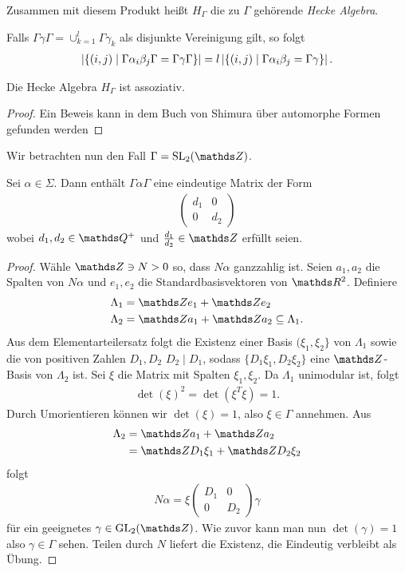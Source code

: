 \begin{defi}
Zusammen mit diesem Produkt heißt $H_\Gamma$ die zu $\Gamma$ gehörende \emph{Hecke Algebra}.
\end{defi}

Falls $\Gamma \gamma \Gamma=\cup_{k=1}^l \Gamma \gamma_k$ als disjunkte Vereinigung gilt,
so folgt
\begin{align*}
\left\vert\{(i,j)\mid \Gamma \alpha_i \beta_j \Gamma=\Gamma \gamma \Gamma\}\right\vert=l \left\vert\{(i,j)\mid \Gamma \alpha_i \beta_j =\Gamma \gamma\}\right\vert.
\end{align*}

\begin{thm}
Die Hecke Algebra $H_\Gamma$ ist assoziativ.
\end{thm}
\begin{proof}
Ein Beweis kann in dem Buch von Shimura über automorphe Formen gefunden werden
\end{proof}

Wir betrachten nun den Fall $\Gamma =\SL_2(\Z)$.
\begin{prop}
Sei $\alpha \in \Sigma$.
Dann enthält $\Gamma \alpha \Gamma$ eine eindeutige Matrix der Form
\begin{align*}
\begin{pmatrix}
d_1&0\\
0&d_2
\end{pmatrix}
\end{align*}
wobei $d_1,d_2 \in \Q^+$ und $\frac{d_1}{d_2}\in \Z$ erfüllt seien.
\end{prop}
\begin{proof}
Wähle $\Z \ni N>0$ so, dass $N\alpha$ ganzzahlig ist.
Seien $a_1,a_2$ die Spalten von $N\alpha$ und $e_1,e_2$ die Standardbasisvektoren von $\R^2$.
Definiere
\begin{align*}
\Lambda_1 &=\Z e_1+\Z e_2\\
\Lambda_2 &=\Z a_1+\Z a_2\subseteq \Lambda_1.
\end{align*}
Aus dem Elementarteilersatz folgt die Existenz einer Basis $(\xi_1,\xi_2\}$ von $\Lambda_1$ sowie die von positiven Zahlen $D_1,D_2$
$D_2 \mid D_1$, sodass $\{D_1\xi_1,D_2\xi_2\}$ eine $\Z$-Basis von $\Lambda_2$ ist.
Sei $\xi$ die Matrix mit Spalten $\xi_1,\xi_2$.
Da $\Lambda_1$ unimodular ist, folgt
\begin{align*}
\det(\xi)^2=\det(\xi^T \xi)=1.
\end{align*}
Durch Umorientieren können wir $\det(\xi)=1$, also $\xi \in \Gamma$ annehmen.
Aus
\begin{align*}
\Lambda_2&=\Z a_1+\Z a_2\\
&=\Z D_1 \xi_1+\Z D_2 \xi_2
\end{align*}
folgt
\begin{align*}
N\alpha=\xi \begin{pmatrix}
D_1&0\\
0&D_2
\end{pmatrix} \gamma
\end{align*}
für ein geeignetes $\gamma \in \GL_2(\Z)$.
Wie zuvor kann man nun $\det(\gamma)=1$ also $\gamma \in \Gamma$ sehen.
Teilen durch $N$ liefert die Existenz, die Eindeutig verbleibt als Übung.
\end{proof}

